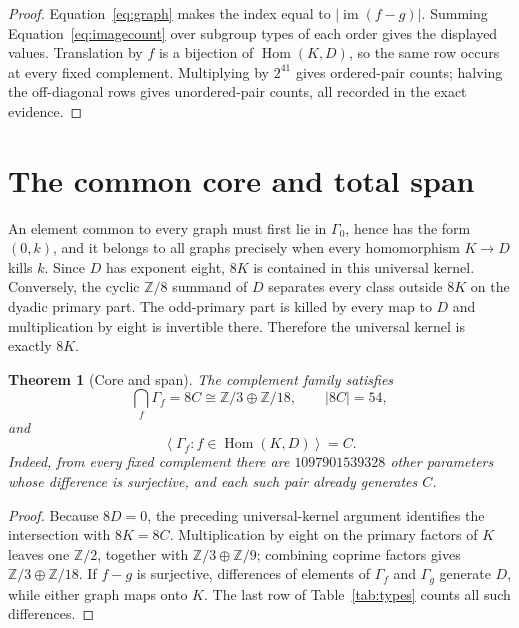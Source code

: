 \documentclass[10pt]{article}
\newtheorem{theorem}{Theorem}
\newcommand{\Z}{\mathbb Z}
\newcommand{\Hom}{\operatorname{Hom}}
\newcommand{\im}{\operatorname{im}}
\begin{document}
\begin{proof}
Equation~\eqref{eq:graph} makes the index equal to $|\im(f-g)|$.  Summing
Equation~\eqref{eq:imagecount} over subgroup types of each order gives the
displayed values.  Translation by $f$ is a bijection of $\Hom(K,D)$, so the
same row occurs at every fixed complement.  Multiplying by $2^{41}$ gives
ordered-pair counts; halving the off-diagonal rows gives unordered-pair
counts, all recorded in the exact evidence.
\end{proof}

\section{The common core and total span}
An element common to every graph must first lie in $\Gamma_0$, hence has the
form $(0,k)$, and it belongs to all graphs precisely when every homomorphism
$K\to D$ kills $k$.  Since $D$ has exponent eight, $8K$ is contained in this
universal kernel.  Conversely, the cyclic $\Z/8$ summand of $D$ separates
every class outside $8K$ on the dyadic primary part.  The odd-primary part is
killed by every map to $D$ and multiplication by eight is invertible there.
Therefore the universal kernel is exactly $8K$.

\begin{theorem}[Core and span]
The complement family satisfies
\[
 \bigcap_f\Gamma_f=8C\cong\Z/3\oplus\Z/18,
 \qquad |8C|=54,
\]
and
\[
 \left\langle\Gamma_f:f\in\Hom(K,D)\right\rangle=C.
\]
Indeed, from every fixed complement there are $1097901539328$ other
parameters whose difference is surjective, and each such pair already
generates $C$.
\end{theorem}

\begin{proof}
Because $8D=0$, the preceding universal-kernel argument identifies the
intersection with $8K=8C$.  Multiplication by eight on the primary factors of
$K$ leaves one $\Z/2$, together with $\Z/3\oplus\Z/9$; combining coprime
factors gives $\Z/3\oplus\Z/18$.  If $f-g$ is surjective, differences of
elements of $\Gamma_f$ and $\Gamma_g$ generate $D$, while either graph maps
onto $K$.  The last row of Table~\ref{tab:types} counts all such differences.
\end{proof}
\end{document}
